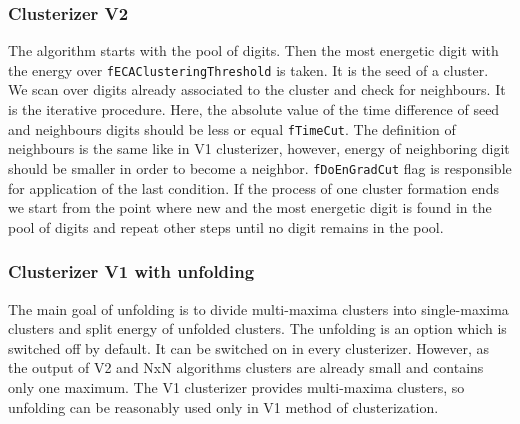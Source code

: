 \subsubsection{Clusterizer V2}
The algorithm starts with the pool of digits. Then the most energetic digit with the energy over \texttt{fECAClusteringThreshold} is taken. It is the seed of a cluster. 
We scan over digits already associated to the cluster and check for neighbours. It is the iterative procedure. Here, the absolute value of the time difference of seed and neighbours digits should be less or equal \texttt{fTimeCut}. The definition of neighbours is the same like in V1 clusterizer, however, energy of neighboring digit should be smaller in order to become a neighbor. \texttt{fDoEnGradCut} flag is responsible for application of the last condition. 
If the process of one cluster formation ends we start from the point where new and the most energetic digit is found in the pool of digits and repeat other steps until no digit remains in the pool.

\subsubsection{Clusterizer V1 with unfolding}
The main goal of unfolding is to divide multi-maxima clusters into single-maxima clusters and split energy of unfolded clusters. The unfolding is an option which is switched off by default. It can be switched on in every clusterizer. However, as the output of V2 and NxN algorithms clusters are already small and contains only one maximum. The V1 clusterizer provides multi-maxima clusters, so unfolding can be reasonably used only in V1 method of clusterization. 

